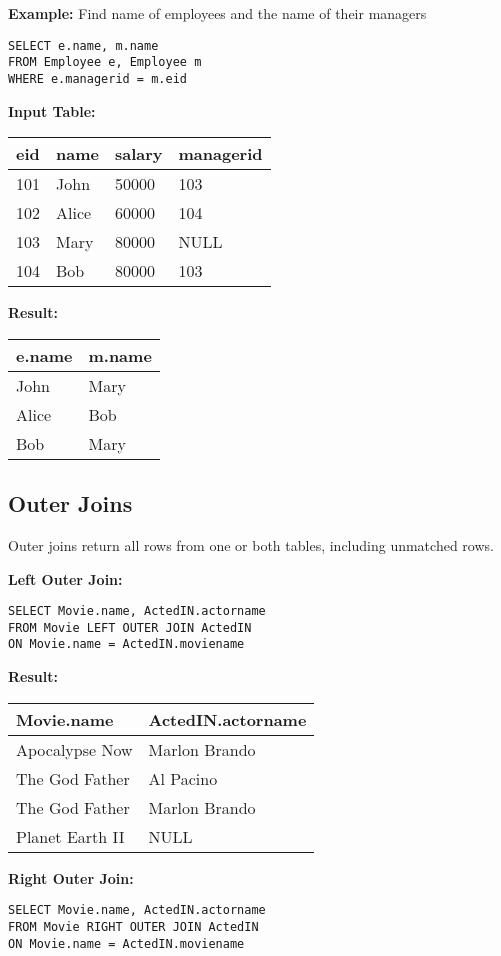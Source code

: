 \documentclass{article}
\begin{document}
\textbf{Example:} Find name of employees and the name of their managers

\begin{verbatim}
SELECT e.name, m.name
FROM Employee e, Employee m
WHERE e.managerid = m.eid
\end{verbatim}

\textbf{Input Table:}
\begin{tabular}{llll}
\hline
eid & name & salary & managerid \\
\hline
101 & John & 50000 & 103 \\
102 & Alice & 60000 & 104 \\
103 & Mary & 80000 & NULL \\
104 & Bob & 80000 & 103 \\
\hline
\end{tabular}

\textbf{Result:}
\begin{tabular}{ll}
\hline
e.name & m.name \\
\hline
John & Mary \\
Alice & Bob \\
Bob & Mary \\
\hline
\end{tabular}

\subsection*{Outer Joins}
Outer joins return all rows from one or both tables, including unmatched rows.

\textbf{Left Outer Join:}
\begin{verbatim}
SELECT Movie.name, ActedIN.actorname
FROM Movie LEFT OUTER JOIN ActedIN
ON Movie.name = ActedIN.moviename
\end{verbatim}

\textbf{Result:}
\begin{tabular}{ll}
\hline
Movie.name & ActedIN.actorname \\
\hline
Apocalypse Now & Marlon Brando \\
The God Father & Al Pacino \\
The God Father & Marlon Brando \\
Planet Earth II & NULL \\
\hline
\end{tabular}

\textbf{Right Outer Join:}
\begin{verbatim}
SELECT Movie.name, ActedIN.actorname
FROM Movie RIGHT OUTER JOIN ActedIN
ON Movie.name = ActedIN.moviename
\end{verbatim}
\end{document}
